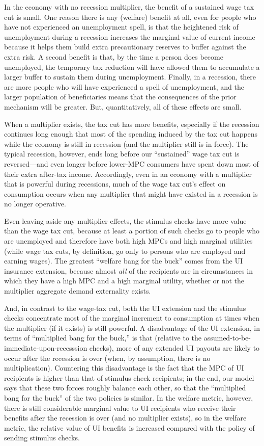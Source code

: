 \documentclass[\econtexRoot/HAFiscal]{subfiles}
\begin{document}
In the economy with no recession multiplier, the benefit of a sustained wage tax cut is small.  One reason there is any (welfare) benefit at all, even for people who have not experienced an unemployment spell, is that the heightened risk of unemployment during a recession increases the marginal value of current income because it helps them build extra precautionary reserves to buffer against the extra risk.  A second benefit is that, by the time a person does become unemployed, the temporary tax reduction will have allowed them to accumulate a larger buffer to sustain them during unemployment.  Finally, in a recession, there are more people who will have experienced a spell of unemployment, and the larger population of beneficiaries means that the consequences of the prior mechanism will be greater.  But, quantitatively, all of these effects are small.

When a multiplier exists, the tax cut has more benefits, especially if the recession continues long enough that most of the spending induced by the tax cut happens while the economy is still in recession (and the multiplier still is in force).  The typical recession, however, ends long before our ``sustained'' wage tax cut is reversed---and even longer before lower-MPC consumers have spent down most of their extra after-tax income. Accordingly, even in an economy with a multiplier that is powerful during recessions, much of the wage tax cut's effect on consumption occurs when any multiplier that might have existed in a recession is no longer operative.

Even leaving aside any multiplier effects, the stimulus checks have more value than the wage tax cut, because at least a portion of such checks go to people who are unemployed and therefore have both high MPCs and high marginal utilities (while wage tax cuts, by definition, go only to persons who are employed and earning wages). The greatest ``welfare bang for the buck'' comes from the UI insurance extension, because almost \textit{all} of the recipients are in circumstances in which they have a high MPC and a high marginal utility, whether or not the multiplier aggregate demand externality exists.

And, in contrast to the wage-tax cut, both the UI extension and the stimulus checks concentrate most of the marginal increment to consumption at times when the multiplier (if it exists) is still powerful.  A disadvantage of the UI extension, in terms of ``multiplied bang for the buck,'' is that (relative to the assumed-to-be-immediate-upon-recesssion checks), more of any extended UI payouts are likely to occur after the recession is over (when, by assumption, there is no multiplication).  Countering this disadvantage is the fact that the MPC of UI recipients is higher than that of stimulus check recipients; in the end, our model says that these two forces roughly balance each other, so that the ``multiplied bang for the buck'' of the two policies is similar.  In the welfare metric, however, there is still considerable marginal value to UI recipients who receive their benefits after the recession is over (and no multiplier exists), so in the welfare metric, the relative value of UI benefits is increased compared with the policy of sending stimulus checks.
\end{document}
